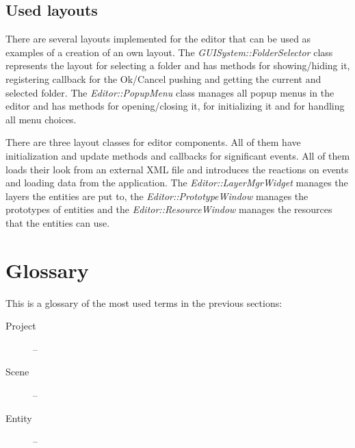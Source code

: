\subsection{Used layouts}

There are several layouts implemented for the editor that can be used as examples of a creation of an own layout. The \emph{GUISystem::FolderSelector} class represents the layout for selecting a folder and has methods for showing/hiding it, registering callback for the Ok/Cancel pushing and getting the current and selected folder. The \emph{Editor::PopupMenu} class manages all popup menus in the editor and has methods for opening/closing it, for initializing it and for handling all menu choices.

There are three layout classes for editor components. All of them have initialization and update methods and callbacks for significant events. All of them loads their look from an external XML file and introduces the reactions on events and loading data from the application. The \emph{Editor::LayerMgrWid\-get} manages the layers the entities are put to, the \emph{Editor::PrototypeWindow} manages the prototypes of entities and the \emph{Editor::ResourceWindow} manages the resources that the entities can use.

\section{Glossary}
This is a glossary of the most used terms in the previous sections:

\begin{description}
  \item[Project] -- 
  \item[Scene] --
  \item[Entity] -- 
\end{description}